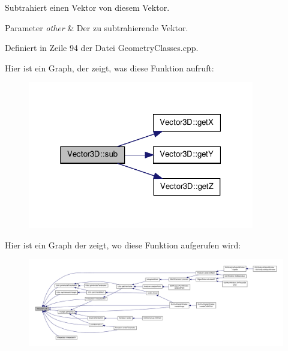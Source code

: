 Subtrahiert einen Vektor von diesem Vektor. 


\begin{DoxyParams}{Parameter}
{\em other} & Der zu subtrahierende Vektor. \\
\hline
\end{DoxyParams}


Definiert in Zeile 94 der Datei Geometry\-Classes.\-cpp.



Hier ist ein Graph, der zeigt, was diese Funktion aufruft\-:\nopagebreak
\begin{figure}[H]
\begin{center}
\leavevmode
\includegraphics[width=280pt]{classVector3D_a02364a41693ac080f5adadd776df74b4_cgraph}
\end{center}
\end{figure}




Hier ist ein Graph der zeigt, wo diese Funktion aufgerufen wird\-:\nopagebreak
\begin{figure}[H]
\begin{center}
\leavevmode
\includegraphics[width=350pt]{classVector3D_a02364a41693ac080f5adadd776df74b4_icgraph}
\end{center}
\end{figure}




